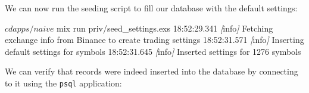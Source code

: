 \documentclass[
  oneside]{book}
\newenvironment{Shaded}{\begin{snugshade}}{\end{snugshade}}
\newcommand{\ExtensionTok}[1]{#1}
\newcommand{\NormalTok}[1]{#1}
\newcommand{\PreprocessorTok}[1]{\textcolor[rgb]{0.56,0.35,0.01}{\textit{#1}}}
\newcommand{\SpecialStringTok}[1]{\textcolor[rgb]{0.31,0.60,0.02}{#1}}
\begin{document}
We can now run the seeding script to fill our database with the default settings:

\begin{Shaded}
\begin{Highlighting}[]
\ExtensionTok{$}\NormalTok{ cd apps/naive}
\ExtensionTok{$}\NormalTok{ mix run priv/seed\_settings.exs}
\ExtensionTok{18:52:29.341} \PreprocessorTok{[}\SpecialStringTok{info}\PreprocessorTok{]}\NormalTok{  Fetching exchange info from Binance to create trading settings}
\ExtensionTok{18:52:31.571} \PreprocessorTok{[}\SpecialStringTok{info}\PreprocessorTok{]}\NormalTok{  Inserting default settings for symbols}
\ExtensionTok{18:52:31.645} \PreprocessorTok{[}\SpecialStringTok{info}\PreprocessorTok{]}\NormalTok{  Inserted settings for 1276 symbols}
\end{Highlighting}
\end{Shaded}

We can verify that records were indeed inserted into the database by connecting to it using the \texttt{psql} application:
\end{document}
